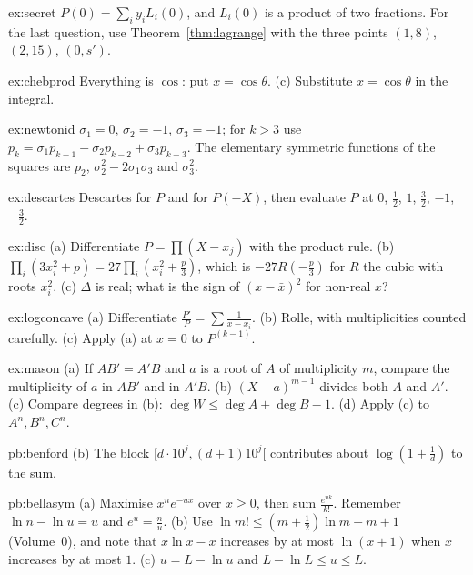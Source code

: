 \begin{hint}{ex:secret}
$P(0)=\sum_iy_iL_i(0)$, and $L_i(0)$ is a product of two fractions. For the last question, use Theorem~\ref{thm:lagrange} with the three points $(1,8)$, $(2,15)$, $(0,s')$.
\end{hint}
\begin{hint}{ex:chebprod}
Everything is $\cos$: put $x=\cos\theta$. (c) Substitute $x=\cos\theta$ in the integral.
\end{hint}
\begin{hint}{ex:newtonid}
$\sigma_1=0$, $\sigma_2=-1$, $\sigma_3=-1$; for $k>3$ use $p_k=\sigma_1p_{k-1}-\sigma_2p_{k-2}+\sigma_3p_{k-3}$. The elementary symmetric functions of the squares are $p_2$, $\sigma_2^2-2\sigma_1\sigma_3$ and $\sigma_3^2$.
\end{hint}
\begin{hint}{ex:descartes}
Descartes for $P$ and for $P(-X)$, then evaluate $P$ at $0$, $\frac12$, $1$, $\frac32$, $-1$, $-\frac32$.
\end{hint}
\begin{hint}{ex:disc}
(a) Differentiate $P=\prod(X-x_j)$ with the product rule. (b) $\prod_i(3x_i^2+p)=27\prod_i(x_i^2+\frac p3)$, which is $-27R(-\frac p3)$ for $R$ the cubic with roots $x_i^2$. (c) $\Delta$ is real; what is the sign of $(x-\bar x)^2$ for non-real $x$?
\end{hint}
\begin{hint}{ex:logconcave}
(a) Differentiate $\frac{P'}P=\sum\frac1{x-x_i}$. (b) Rolle, with multiplicities counted carefully. (c) Apply (a) at $x=0$ to $P^{(k-1)}$.
\end{hint}
\begin{hint}{ex:mason}
(a) If $AB'=A'B$ and $a$ is a root of $A$ of multiplicity $m$, compare the multiplicity of $a$ in $AB'$ and in $A'B$. (b) $(X-a)^{m-1}$ divides both $A$ and $A'$. (c) Compare degrees in (b): $\deg W\le\deg A+\deg B-1$. (d) Apply (c) to $A^n,B^n,C^n$.
\end{hint}

\begin{hint}{pb:benford}
(b) The block $[d\cdot10^j,(d+1)10^j[$ contributes about $\log(1+\frac1d)$ to the sum.
\end{hint}

\begin{hint}{pb:bellasym}
(a) Maximise $x^ne^{-ux}$ over $x\ge0$, then sum $\frac{e^{uk}}{k!}$. Remember $\ln n-\ln u=u$ and $e^u=\frac nu$. (b) Use $\ln m!\le(m+\frac12)\ln m-m+1$ (Volume~0), and note that $x\ln x-x$
increases by at most $\ln(x+1)$ when $x$ increases by at most $1$. (c) $u=L-\ln u$ and $L-\ln L\le u\le L$.
\end{hint}

